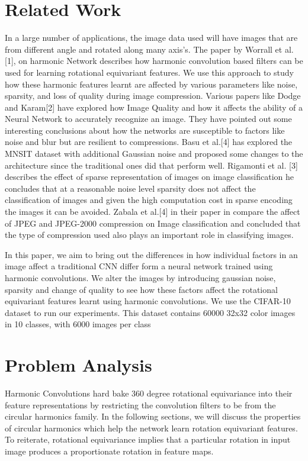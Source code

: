 \documentclass{article}
\begin{document}

\section{Related Work}
In a large number of applications, the image data used will have images that are from different angle and rotated along many axis’s. The paper by Worrall et al. [1], on harmonic Network describes how harmonic convolution based filters can be used for learning rotational equivariant features. We use this approach to study how these harmonic features learnt are affected by various parameters like noise, sparsity, and loss of quality during image compression. Various papers like Dodge and Karam[2] have explored how Image Quality and how it affects the ability of a Neural Network to accurately recognize an image. They have pointed out some interesting conclusions about how the networks are susceptible to factors like noise and blur but are resilient to compressions. Basu et al.[4] has explored the MNSIT dataset with additional Gaussian noise and proposed some changes to the architecture since the traditional ones did that perform well. Rigamonti et al. [3] describes the effect of sparse representation of images on image classification he concludes that at a reasonable noise level sparsity does not affect the classification of images and given the high computation cost in sparse encoding the images it can be avoided. Zabala et al.[4] in their paper in compare the affect of JPEG and JPEG-2000 compression on Image classification and concluded that the type of compression used also plays an important role in classifying images.

In this paper, we aim to bring out the differences in how individual factors in an image affect a traditional CNN differ form a neural network trained using harmonic convolutions. We alter the images by introducing gaussian noise, sparsity and change of quality to see how these factors affect the rotational equivariant features learnt using harmonic convolutions. We use the CIFAR-10 dataset to run our experiments. This dataset contains 60000 32x32 color images in 10 classes, with 6000 images per class


\section{Problem Analysis}
Harmonic Convolutions hard bake 360 degree rotational equivariance into their feature representations by restricting the convolution filters to be from the circular harmonics family. In the following sections, we will discuss the properties of circular harmonics which help the network learn rotation equivariant features. To reiterate, rotational equivariance implies that a particular rotation in input image produces a proportionate rotation in feature maps.
\end{document}
